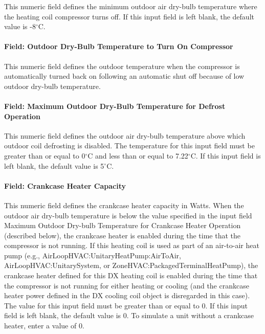 This numeric field defines the minimum outdoor air dry-bulb temperature where the heating coil compressor turns off. If this input field is left blank, the default value is -8$^\circ$C.

\paragraph{Field: Outdoor Dry-Bulb Temperature to Turn On Compressor}\label{field-outdoor-dry-bulb-temperature-to-turn-on-compressor-1}

This numeric field defines the outdoor temperature when the compressor is automatically turned back on following an automatic shut off because of low outdoor dry-bulb temperature.

\paragraph{Field: Maximum Outdoor Dry-Bulb Temperature for Defrost Operation}\label{field-maximum-outdoor-dry-bulb-temperature-for-defrost-operation-2}

This numeric field defines the outdoor air dry-bulb temperature above which outdoor coil defrosting is disabled. The temperature for this input field must be greater than or equal to 0$^\circ$C and less than or equal to 7.22$^\circ$C. If this input field is left blank, the default value is 5$^\circ$C.

\paragraph{Field: Crankcase Heater Capacity}\label{field-crankcase-heater-capacity-6}

This numeric field defines the crankcase heater capacity in Watts. When the outdoor air dry-bulb temperature is below the value specified in the input field Maximum Outdoor Dry-bulb Temperature for Crankcase Heater Operation (described below), the crankcase heater is enabled during the time that the compressor is not running. If this heating coil is used as part of an air-to-air heat pump (e.g., AirLoopHVAC:UnitaryHeatPump:AirToAir, AirLoopHVAC:UnitarySystem, or ZoneHVAC:PackagedTerminalHeatPump), the crankcase heater defined for this DX heating coil is enabled during the time that the compressor is not running for either heating or cooling (and the crankcase heater power defined in the DX cooling coil object is disregarded in this case). The value for this input field must be greater than or equal to 0. If this input field is left blank, the default value is 0. To simulate a unit without a crankcase heater, enter a value of 0.

